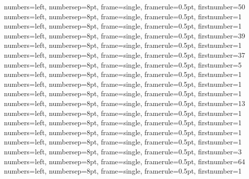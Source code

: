 {numbers=left, numbersep=8pt, frame=single, framerule=0.5pt, firstnumber=50}
{numbers=left, numbersep=8pt, frame=single, framerule=0.5pt, firstnumber=1}
{numbers=left, numbersep=8pt, frame=single, framerule=0.5pt, firstnumber=1}
{numbers=left, numbersep=8pt, frame=single, framerule=0.5pt, firstnumber=39}
{numbers=left, numbersep=8pt, frame=single, framerule=0.5pt, firstnumber=1}
{numbers=left, numbersep=8pt, frame=single, framerule=0.5pt, firstnumber=37}
{numbers=left, numbersep=8pt, frame=single, framerule=0.5pt, firstnumber=5}
{numbers=left, numbersep=8pt, frame=single, framerule=0.5pt, firstnumber=1}
{numbers=left, numbersep=8pt, frame=single, framerule=0.5pt, firstnumber=1}
{numbers=left, numbersep=8pt, frame=single, framerule=0.5pt, firstnumber=1}
{numbers=left, numbersep=8pt, frame=single, framerule=0.5pt, firstnumber=13}
{numbers=left, numbersep=8pt, frame=single, framerule=0.5pt, firstnumber=1}
{numbers=left, numbersep=8pt, frame=single, framerule=0.5pt, firstnumber=1}
{numbers=left, numbersep=8pt, frame=single, framerule=0.5pt, firstnumber=1}
{numbers=left, numbersep=8pt, frame=single, framerule=0.5pt, firstnumber=1}
{numbers=left, numbersep=8pt, frame=single, framerule=0.5pt, firstnumber=3}
{numbers=left, numbersep=8pt, frame=single, framerule=0.5pt, firstnumber=64}
{numbers=left, numbersep=8pt, frame=single, framerule=0.5pt, firstnumber=1}